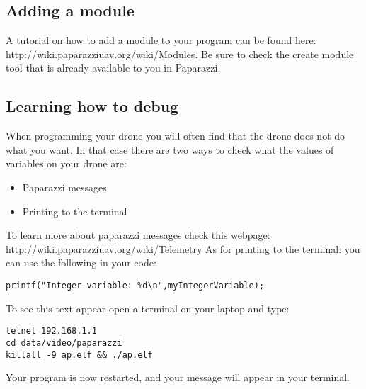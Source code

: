 \documentclass{article}
\begin{document}
\subsection*{Adding a module}
A tutorial on how to add a module to your program can be found here: http://wiki.paparazziuav.org/wiki/Modules.
Be sure to check the create module tool that is already available to you in Paparazzi. 

\subsection*{Learning how to debug}
When programming your drone you will often find that the drone does not do what you want. In that case there are two ways to check what the values of variables on your drone are:
\begin{itemize}
	\item Paparazzi messages
	\item Printing to the terminal
\end{itemize}
To learn more about paparazzi messages check this webpage: http://wiki.paparazziuav.org/wiki/Telemetry
As for printing to the terminal: you can use the following in your code:

\begin{verbatim}
printf("Integer variable: %d\n",myIntegerVariable);
\end{verbatim}
To see this text appear open a terminal on your laptop and type:
\begin{verbatim}
telnet 192.168.1.1
cd data/video/paparazzi
killall -9 ap.elf && ./ap.elf
\end{verbatim}
Your program is now restarted, and your message will appear in your terminal. 
\end{document}
